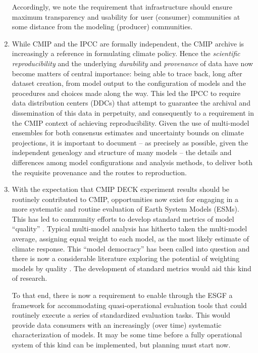\documentclass[gmd,manuscript]{copernicus}
\newcommand{\pllabel}[1]{\label{p-#1}\linelabel{l-#1}}
\begin{document}
\begin{enumerate}
  Accordingly, we note the requirement that infrastructure should
  ensure maximum transparency and usability for user (consumer)
  communities at some distance from the modeling (producer)
  communities.
\item\label{repro} While CMIP and the IPCC are formally independent,
  the CMIP archive is increasingly a reference in formulating climate
  policy. Hence the \emph{scientific reproducibility}
  \citep{ref:collinstabak2014} and the underlying \emph{durability}
  and \emph{provenance} of data have now become matters of central
  importance: being able to trace
  \pllabel{RC2-15}
  back, long after dataset creation, from model output to the configuration of
  models and the procedures and choices made along the way. This led the
  IPCC to require data distribution centers (DDCs) that attempt to
  guarantee the archival and dissemination of this data in perpetuity,
  and consequently to a requirement in the CMIP context of
  achieving reproducibility. Given the use of multi-model ensembles
  for both consensus estimates and uncertainty bounds on climate
  projections, it is important to document -- as precisely as
  possible, given the independent genealogy and structure of many
  models -- the details and differences among model configurations and
  analysis methods, to deliver both the requisite provenance and the
  routes to reproduction.
\item\label{analysis} With the expectation that CMIP DECK experiment
  results should be routinely contributed to CMIP, opportunities now
  exist for engaging in a more systematic and routine evaluation of
  Earth System Models (ESMs). This has led to community efforts to
  develop standard metrics of model ``quality''
  \citep{ref:eyringetal2016,ref:gleckleretal2016}.
  \pllabel{RC2-16}
  Typical multi-model analysis has hitherto taken the multi-model
  average, assigning equal weight to each model, as the most likely
  estimate of climate response. This ``model democracy''
  \citep{ref:knutti2010} has been called into question and there is
  now a considerable literature exploring the potential of weighting
  models by quality \citep{ref:knuttietal2017}. The development of
  standard metrics would aid this kind of research.

  To that end, there is now a requirement to enable through the ESGF a
  framework for accommodating quasi-operational evaluation tools that
  could routinely execute a series of standardized evaluation tasks.
  This would provide data consumers with an increasingly (over time)
  systematic characterization of models. It may be some time before a
  fully operational system of this kind can be implemented, but
  planning must start now.


\end{enumerate}
\end{document}
